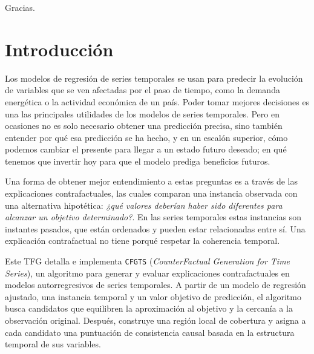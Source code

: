 \documentclass[12pt]{report} %
\begin{document}
Gracias.
\vfill

\newpage %
\thispagestyle{empty}
\mbox{}



\tableofcontents
\thispagestyle{fancy}

\newpage %
\thispagestyle{empty}
\mbox{}

\listoffigures
\thispagestyle{fancy}

\newpage %
\thispagestyle{empty}
\mbox{}

\listoftables
\thispagestyle{fancy}

\newpage %
\thispagestyle{empty}
\mbox{}


\clearpage
{} %

\chapter{Introducción}
\label{cap:introduccion}

Los modelos de regresión de series temporales se usan para predecir la evolución de variables que se ven afectadas por el paso de tiempo, como la demanda energética o la actividad económica de un país. Poder tomar mejores decisiones es una las principales utilidades de los modelos de series temporales. Pero en ocasiones no es solo necesario obtener una predicción precisa, sino también entender por qué esa predicción se ha hecho, y en un escalón superior, cómo podemos cambiar el presente para llegar a un estado futuro deseado; en qué tenemos que invertir hoy para que el modelo prediga beneficios futuros.

Una forma de obtener mejor entendimiento a estas preguntas es a través de las explicaciones contrafactuales, las cuales comparan una instancia observada con una alternativa hipotética: \textit{¿qué valores deberían haber sido diferentes para alcanzar un objetivo determinado?}. En las series temporales estas instancias son instantes pasados, que están ordenados y pueden estar relacionadas entre sí. Una explicación contrafactual no tiene porqué respetar la coherencia temporal.

Este TFG detalla e implementa \texttt{CFGTS} (\textit{CounterFactual Generation for Time Series}), un algoritmo para generar y evaluar explicaciones contrafactuales en modelos autorregresivos de series temporales. A partir de un modelo de regresión ajustado, una instancia temporal y un valor objetivo de predicción, el algoritmo busca candidatos que equilibren la aproximación al objetivo y la cercanía a la observación original. Después, construye una región local de cobertura y asigna a cada candidato una puntuación de consistencia causal basada en la estructura temporal de sus variables.
\end{document}
